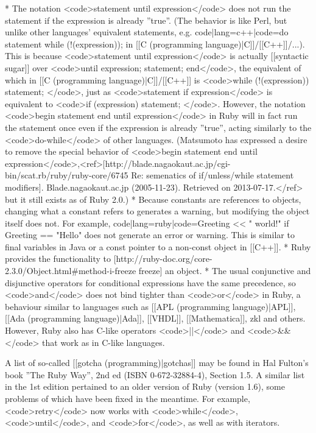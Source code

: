 * The notation <code>statement until expression</code> does not run the statement if the expression is already ''true''. (The behavior is like Perl, but unlike other languages' equivalent statements, e.g. {{code|lang=c++|code=do { statement } while (!(expression));}} in [[C (programming language)|C]]/[[C++]]/...). This is because <code>statement until expression</code> is actually [[syntactic sugar]] over <code>until expression; statement; end</code>, the equivalent of which in [[C (programming language)|C]]/[[C++]] is <code>while (!(expression)) { statement; }</code>, just as <code>statement if expression</code> is equivalent to <code>if (expression) { statement; }</code>. However, the notation <code>begin statement end until expression</code> in Ruby will in fact run the statement once even if the expression is already ''true'', acting similarly to the <code>do-while</code> of other languages. (Matsumoto has expressed a desire to remove the special behavior of <code>begin statement end until expression</code>,<ref>[http://blade.nagaokaut.ac.jp/cgi-bin/scat.rb/ruby/ruby-core/6745 Re: semenatics of if/unless/while statement modifiers]. Blade.nagaokaut.ac.jp (2005-11-23). Retrieved on 2013-07-17.</ref> but it still exists as of Ruby 2.0.)
* Because constants are references to objects, changing what a constant refers to generates a warning, but modifying the object itself does not. For example, {{code|lang=ruby|code=Greeting << " world!" if Greeting == "Hello"}} does not generate an error or warning. This is similar to final variables in Java or a const pointer to a non-const object in [[C++]].
* Ruby provides the functionality to [http://ruby-doc.org/core-2.3.0/Object.html#method-i-freeze freeze] an object.
* The usual conjunctive and disjunctive operators for conditional expressions have the same precedence, so <code>and</code> does not bind tighter than <code>or</code> in Ruby, a behaviour similar to languages such as [[APL (programming language)|APL]], [[Ada (programming language)|Ada]], [[VHDL]], [[Mathematica]], zkl and others. However, Ruby also has C-like operators  <code>||</code> and <code>&&</code> that work as in C-like languages.

A list of so-called [[gotcha (programming)|gotchas]] may be found in Hal Fulton's book ''The Ruby Way'', 2nd ed (ISBN 0-672-32884-4), Section 1.5. A similar list in the 1st edition pertained to an older version of Ruby (version 1.6), some problems of which have been fixed in the meantime. For example, <code>retry</code> now works with <code>while</code>, <code>until</code>, and <code>for</code>, as well as with iterators.

